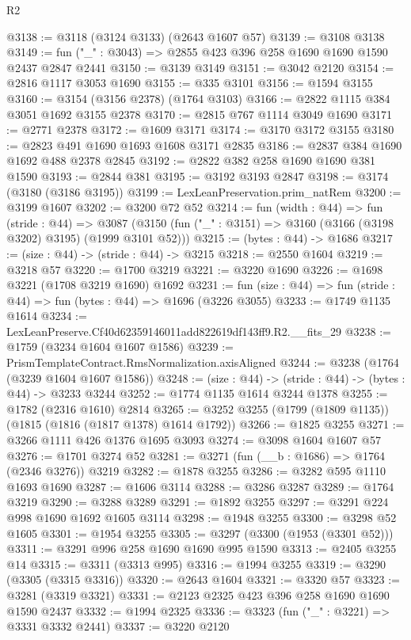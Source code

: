 \begin{lexlean}{R2}
\begin{coremodule}
@3138 := @3118 (@3124 @3133) (@2643 @1607 @57)
@3139 := @3108 @3138
@3149 := fun ("_" : @3043) => @2855 @423 @396 @258 @1690 @1690 @1590 @2437 @2847 @2441
@3150 := @3139 @3149
@3151 := @3042 @2120
@3154 := @2816 @1117 @3053 @1690
@3155 := @335 @3101
@3156 := @1594 @3155
@3160 := @3154 (@3156 @2378) (@1764 @3103)
@3166 := @2822 @1115 @384 @3051 @1692 @3155 @2378
@3170 := @2815 @767 @1114 @3049 @1690
@3171 := @2771 @2378
@3172 := @1609 @3171
@3174 := @3170 @3172 @3155
@3180 := @2823 @491 @1690 @1693 @1608 @3171 @2835
@3186 := @2837 @384 @1690 @1692 @488 @2378 @2845
@3192 := @2822 @382 @258 @1690 @1690 @381 @1590
@3193 := @2844 @381
@3195 := @3192 @3193 @2847
@3198 := @3174 (@3180 (@3186 @3195))
@3199 := LexLeanPreservation.prim_natRem
@3200 := @3199 @1607
@3202 := @3200 @72 @52
@3214 := fun (width : @44) =>
  fun (stride : @44) =>
  @3087 (@3150 (fun ("_" : @3151) => @3160 (@3166 (@3198 @3202) @3195) (@1999 @3101 @52)))
@3215 := (bytes : @44) -> @1686
@3217 := (size : @44) -> (stride : @44) -> @3215
@3218 := @2550 @1604
@3219 := @3218 @57
@3220 := @1700 @3219
@3221 := @3220 @1690
@3226 := @1698 @3221 (@1708 @3219 @1690) @1692
@3231 := fun (size : @44) => fun (stride : @44) => fun (bytes : @44) => @1696 (@3226 @3055)
@3233 := @1749 @1135 @1614
@3234 := LexLeanPreserve.Cf40d62359146011add822619df143ff9.R2.__fits_29
@3238 := @1759 (@3234 @1604 @1607 @1586)
@3239 := PrismTemplateContract.RmsNormalization.axisAligned
@3244 := @3238 (@1764 (@3239 @1604 @1607 @1586))
@3248 := (size : @44) -> (stride : @44) -> (bytes : @44) -> @3233 @3244
@3252 := @1774 @1135 @1614 @3244 @1378
@3255 := @1782 (@2316 @1610) @2814
@3265 := @3252 @3255 (@1799 (@1809 @1135)) (@1815 (@1816 (@1817 @1378) @1614 @1792))
@3266 := @1825 @3255
@3271 := @3266 @1111 @426 @1376 @1695 @3093
@3274 := @3098 @1604 @1607 @57
@3276 := @1701 @3274 @52
@3281 := @3271 (fun (__b : @1686) => @1764 (@2346 @3276)) @3219
@3282 := @1878 @3255
@3286 := @3282 @595 @1110 @1693 @1690
@3287 := @1606 @3114
@3288 := @3286 @3287
@3289 := @1764 @3219
@3290 := @3288 @3289
@3291 := @1892 @3255
@3297 := @3291 @224 @998 @1690 @1692 @1605 @3114
@3298 := @1948 @3255
@3300 := @3298 @52 @1605
@3301 := @1954 @3255
@3305 := @3297 (@3300 (@1953 (@3301 @52)))
@3311 := @3291 @996 @258 @1690 @1690 @995 @1590
@3313 := @2405 @3255 @14
@3315 := @3311 (@3313 @995)
@3316 := @1994 @3255
@3319 := @3290 (@3305 (@3315 @3316))
@3320 := @2643 @1604
@3321 := @3320 @57
@3323 := @3281 (@3319 @3321)
@3331 := @2123 @2325 @423 @396 @258 @1690 @1690 @1590 @2437
@3332 := @1994 @2325
@3336 := @3323 (fun ("_" : @3221) => @3331 @3332 @2441)
@3337 := @3220 @2120

\end{coremodule}
\end{lexlean}
